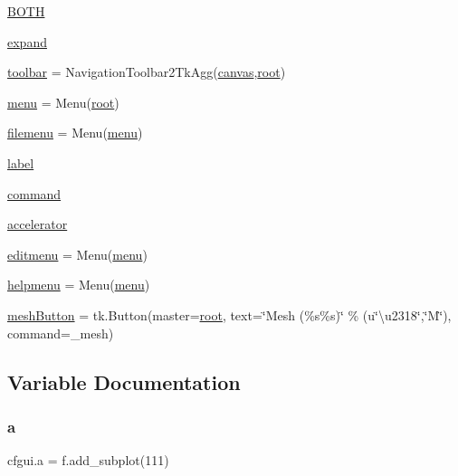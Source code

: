 \begin{DoxyCompactItemize}
\item 
\mbox{\hyperlink{namespacecfgui_ae68d5f9438e41baf4820d8044f868346}{B\+O\+TH}}
\item 
\mbox{\hyperlink{namespacecfgui_a584b910dd9e596e04fe616d866f91ff2}{expand}}
\item 
\mbox{\hyperlink{namespacecfgui_a7410773bac81022643bbb700b65ffd35}{toolbar}} = Navigation\+Toolbar2\+Tk\+Agg(\mbox{\hyperlink{namespacecfgui_aafee5f0725f5961d2bc6696ddac838ce}{canvas}},\mbox{\hyperlink{namespacecfgui_ad0261b0d3cca8159d011afa3c17bd9f1}{root}})
\item 
\mbox{\hyperlink{namespacecfgui_a178f690140e4928e80ed598ebbbf6ec1}{menu}} = Menu(\mbox{\hyperlink{namespacecfgui_ad0261b0d3cca8159d011afa3c17bd9f1}{root}})
\item 
\mbox{\hyperlink{namespacecfgui_ae54e3f8d355a03929c89a227c506d39e}{filemenu}} = Menu(\mbox{\hyperlink{namespacecfgui_a178f690140e4928e80ed598ebbbf6ec1}{menu}})
\item 
\mbox{\hyperlink{namespacecfgui_a5bb1e89c42bd42a9baf53da59a27658d}{label}}
\item 
\mbox{\hyperlink{namespacecfgui_a32a18002fc6635b3c814b5e9b329ec6b}{command}}
\item 
\mbox{\hyperlink{namespacecfgui_aa44f9f5c68e640ec65a1a1c93e148982}{accelerator}}
\item 
\mbox{\hyperlink{namespacecfgui_afef0987be82596ace82157e0682cac34}{editmenu}} = Menu(\mbox{\hyperlink{namespacecfgui_a178f690140e4928e80ed598ebbbf6ec1}{menu}})
\item 
\mbox{\hyperlink{namespacecfgui_a3a48ab8eff50c8134be0e6351bc9279d}{helpmenu}} = Menu(\mbox{\hyperlink{namespacecfgui_a178f690140e4928e80ed598ebbbf6ec1}{menu}})
\item 
\mbox{\hyperlink{namespacecfgui_a4cb6233c9db194dad78f3a686d22475c}{mesh\+Button}} = tk.\+Button(master=\mbox{\hyperlink{namespacecfgui_ad0261b0d3cca8159d011afa3c17bd9f1}{root}}, text=\char`\"{}Mesh (\%s\%s)\char`\"{} \% (u\char`\"{}\textbackslash{}u2318\char`\"{},\char`\"{}M\char`\"{}), command=\+\_\+mesh)
\end{DoxyCompactItemize}


\subsection{Variable Documentation}
\mbox{\label{namespacecfgui_afa1e0012aec603eb6c61806994452873}} 
\subsubsection{\texorpdfstring{a}{a}}
{\footnotesize\ttfamily cfgui.\+a = f.\+add\+\_\+subplot(111)}

